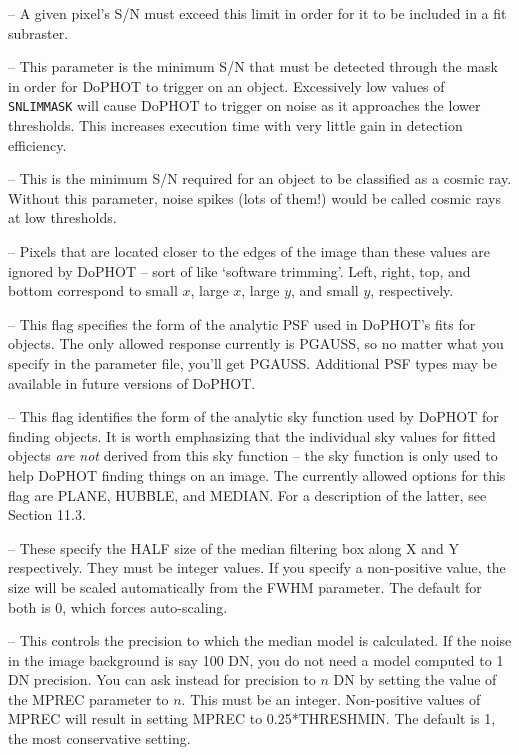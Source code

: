  -- A given pixel's S/N must exceed this limit
in order for it to be included in a fit subraster.

 -- This parameter is the minimum S/N that
must be detected through the mask in order for DoPHOT to 
trigger on an object.   
Excessively low values of
{\tt SNLIMMASK} will cause DoPHOT to trigger on noise as it
approaches the lower thresholds.  This increases execution time with 
very little gain in detection efficiency.

 -- This is the minimum S/N required for 
an object to be classified as a cosmic ray.  Without
this parameter, noise spikes (lots of them!) would be called cosmic rays at 
low thresholds.  

 -- Pixels
that are located closer to the edges of the image than these 
values are ignored
by DoPHOT -- sort of like `software trimming'.  Left, right,
top, and bottom correspond to small $x$, large $x$, large $y$, and
small $y$, respectively.

 -- This flag specifies the form of the
analytic PSF used in DoPHOT's fits for objects.  The only
allowed response currently is PGAUSS, so no matter what you
specify in the parameter file, you'll get PGAUSS.  Additional 
PSF types may be available in future versions of DoPHOT.

 -- This flag identifies the form of the
analytic sky function used by DoPHOT for finding objects.  
It is worth emphasizing that the individual sky values for 
fitted objects {\it are not} derived from this sky function --
the sky function 
is only used to help DoPHOT finding things on an image.  The
currently allowed options for this flag are PLANE, HUBBLE, and MEDIAN.
For a description of the latter, see Section 11.3.

 --  These specify the HALF size of the median
filtering box along X and Y respectively. They must be integer values.
If you specify a non-positive value, the size will be scaled
automatically from the FWHM parameter.
The default for both is 0, which forces auto-scaling.

 --  This controls the precision to which 
the median model is
calculated. If the noise in the image background is say 100 DN, you do 
not need a model computed to 1 DN precision. 
You can ask instead for precision to $n$ DN by setting the value of the
MPREC parameter to $n$. This must be an integer. 
Non-positive values of MPREC will result in 
setting MPREC to 0.25*THRESHMIN.
The default is 1, the most conservative setting.

